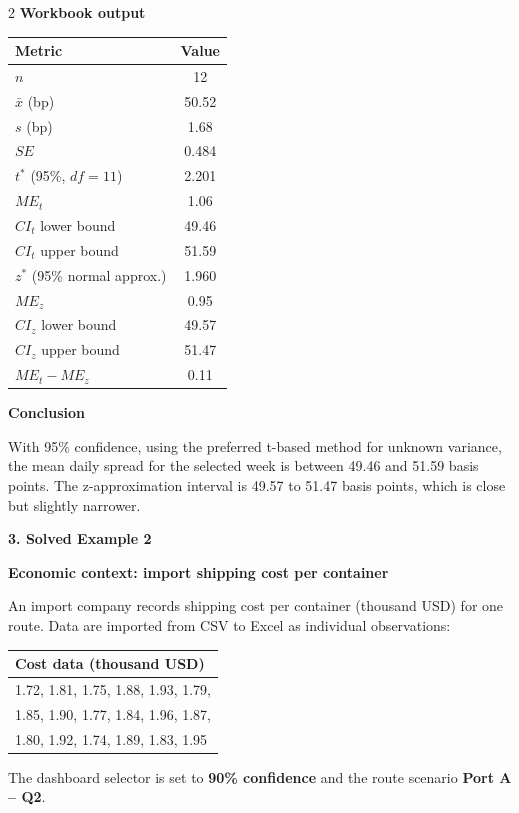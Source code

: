 \documentclass[12pt]{article}
\newcommand{\SubsectionBox}[1]{%
	\noindent\colorbox{gray!30}{%
		\parbox{\linewidth}{\textbf{#1}}%
	}\par\vspace{0.35cm}%
}
\begin{document}
\begin{multicols}{2}
		\textbf{Workbook output}\par
		\begin{center}
			\begin{tabular}{l c}
				\hline
				Metric & Value \\
				\hline
				$n$ & 12 \\
				$\bar{x}$ (bp) & 50.52 \\
				$s$ (bp) & 1.68 \\
				$SE$ & 0.484 \\
				$t^*$ (95\%, $df=11$) & 2.201 \\
				$ME_t$ & 1.06 \\
				$CI_t$ lower bound & 49.46 \\
				$CI_t$ upper bound & 51.59 \\
				$z^*$ (95\% normal approx.) & 1.960 \\
				$ME_z$ & 0.95 \\
				$CI_z$ lower bound & 49.57 \\
				$CI_z$ upper bound & 51.47 \\
				$ME_t-ME_z$ & 0.11 \\
				\hline
			\end{tabular}
		\end{center}
		
		\textbf{Conclusion}\par
		With 95\% confidence, using the preferred t-based method for unknown variance, the mean daily spread for the selected week is between 49.46 and 51.59 basis points. The z-approximation interval is 49.57 to 51.47 basis points, which is close but slightly narrower.
		
		\vspace{1cm}
		\SubsectionBox{3. Solved Example 2}
		
		\textbf{Economic context: import shipping cost per container}\par
		An import company records shipping cost per container (thousand USD) for one route.
		Data are imported from CSV to Excel as individual observations:
		
		\begin{center}
			\begin{tabular}{l}
				\hline
				Cost data (thousand USD) \\
				\hline
				1.72, 1.81, 1.75, 1.88, 1.93, 1.79,\\
				1.85, 1.90, 1.77, 1.84, 1.96, 1.87,\\
				1.80, 1.92, 1.74, 1.89, 1.83, 1.95 \\
				\hline
			\end{tabular}
		\end{center}
		The dashboard selector is set to \textbf{90\% confidence} and the route scenario \textbf{Port A -- Q2}.
		

\end{multicols}
\end{document}
